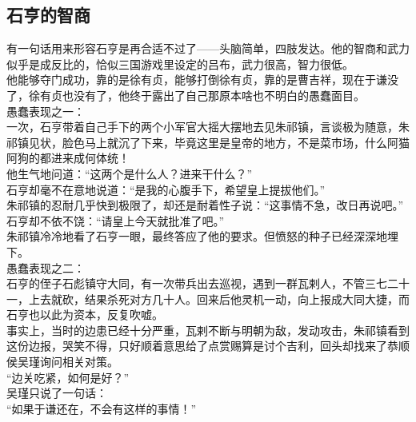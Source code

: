 	\begin{multicols}{\theparacolNo}
\fi
\subsection{石亨的智商}
有一句话用来形容石亨是再合适不过了——头脑简单，四肢发达。他的智商和武力似乎是成反比的，恰似三国游戏里设定的吕布，武力很高，智力很低。\\

他能够夺门成功，靠的是徐有贞，能够打倒徐有贞，靠的是曹吉祥，现在于谦没了，徐有贞也没有了，他终于露出了自己那原本啥也不明白的愚蠢面目。\\

愚蠢表现之一：\\

一次，石亨带着自己手下的两个小军官大摇大摆地去见朱祁镇，言谈极为随意，朱祁镇见状，脸色马上就沉了下来，毕竟这里是皇帝的地方，不是菜市场，什么阿猫阿狗的都进来成何体统！\\

他生气地问道：“这两个是什么人？进来干什么？”\\

石亨却毫不在意地说道：“是我的心腹手下，希望皇上提拔他们。”\\

朱祁镇的忍耐几乎快到极限了，却还是耐着性子说：“这事情不急，改日再说吧。”\\

石亨却不依不饶：“请皇上今天就批准了吧。”\\

朱祁镇冷冷地看了石亨一眼，最终答应了他的要求。但愤怒的种子已经深深地埋下。\\

愚蠢表现之二：\\

石亨的侄子石彪镇守大同，有一次带兵出去巡视，遇到一群瓦剌人，不管三七二十一，上去就砍，结果杀死对方几十人。回来后他灵机一动，向上报成大同大捷，而石亨也以此为资本，反复吹嘘。\\

事实上，当时的边患已经十分严重，瓦剌不断与明朝为敌，发动攻击，朱祁镇看到这份边报，哭笑不得，只好顺着意思给了点赏赐算是讨个吉利，回头却找来了恭顺侯吴瑾询问相关对策。\\

“边关吃紧，如何是好？”\\

吴瑾只说了一句话：\\

“如果于谦还在，不会有这样的事情！”\\


\end{multicols}
